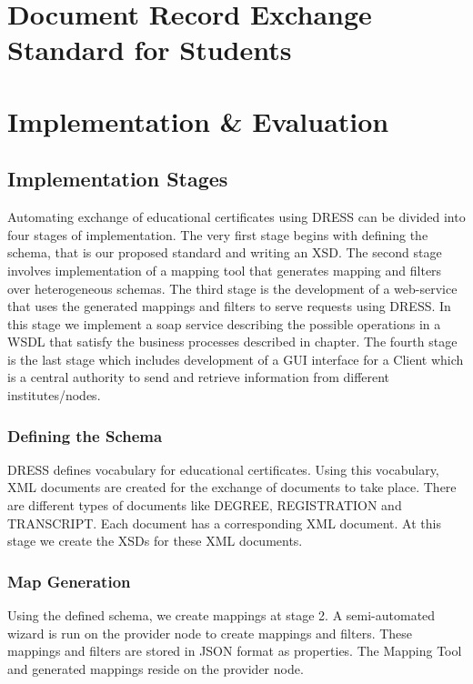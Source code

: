 \documentclass[12pt,a4paper,oneside]{book}
\begin{document}



\chapter{Document Record Exchange Standard for Students}\label{ch-DRESS}

\chapter{Implementation \& Evaluation}\label{ch-implement}


\section{Implementation Stages}
Automating exchange of educational certificates using DRESS can be divided into four stages of implementation. The very first stage begins with defining the schema, that is our proposed standard and writing an XSD. The second stage involves implementation of a mapping tool that generates mapping and filters over heterogeneous schemas. The third stage is the development of a web-service that uses the generated mappings and filters to serve requests using DRESS. In this stage we implement a soap service describing the possible operations in a WSDL that satisfy the business processes described in chapter. The fourth stage is the last stage which includes development of a GUI interface for a Client which is a central authority to send and retrieve information from different institutes/nodes.
 
\subsection{Defining the Schema}
DRESS defines vocabulary for educational certificates. Using this vocabulary, XML documents are created for the exchange of documents to take place. There are different types of documents like DEGREE, REGISTRATION and TRANSCRIPT. Each document has a corresponding XML document. At this stage we create the XSDs for these XML documents.

\subsection{Map Generation}
Using the defined schema, we create mappings at stage 2. A semi-automated wizard is run on the provider node to create mappings and filters. These mappings and filters are stored in JSON format as properties.  The Mapping Tool and generated mappings reside on the provider node.
\end{document}
